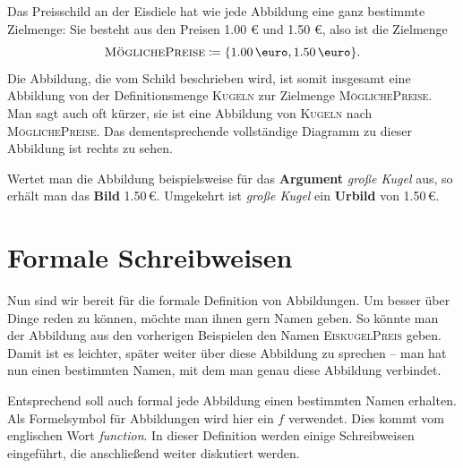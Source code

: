 \documentclass[../../main.tex]{subfiles}
\begin{document}
\pagebreak
\begin{example}{}
    Das Preisschild an der Eisdiele hat wie jede Abbildung eine ganz bestimmte Zielmenge: Sie besteht aus den Preisen 1.00 \euro{} und 1.50 \euro, also ist die Zielmenge \[\textsc{MöglichePreise}\coloneqq\{\text{1.00\,\euro},\text{1.50\,\euro}\}.\]
    Die Abbildung, die vom Schild beschrieben wird, ist somit insgesamt eine Abbildung von der Definitionsmenge \textsc{Kugeln} zur Zielmenge \textsc{MöglichePreise}. Man sagt auch oft kürzer, sie ist eine Abbildung von \textsc{Kugeln} nach \textsc{MöglichePreise}. Das dementsprechende vollständige Diagramm zu dieser Abbildung ist rechts zu sehen.
    
    Wertet man die Abbildung beispielsweise für das \textbf{Argument} \emph{große Kugel} aus, so erhält man das \textbf{Bild} 1.50\,\euro. Umgekehrt ist \emph{große Kugel} ein \textbf{Urbild} von 1.50\,\euro.
\end{example}


\section*{Formale Schreibweisen}
\label{sec:abbildungen_definition}
Nun sind wir bereit für die formale Definition von Abbildungen. Um besser über Dinge reden zu können, möchte man ihnen gern Namen geben. So könnte man der Abbildung aus den vorherigen Beispielen den Namen \textsc{EiskugelPreis} geben. Damit ist es leichter, später weiter über diese Abbildung zu sprechen -- man hat nun einen bestimmten Namen, mit dem man genau diese Abbildung verbindet.

Entsprechend soll auch formal jede Abbildung einen bestimmten Namen erhalten. Als Formelsymbol für Abbildungen wird hier ein $f$ verwendet. Dies kommt vom englischen Wort \emph{function}. In dieser Definition werden einige Schreibweisen eingeführt, die anschließend weiter diskutiert werden.
\end{document}

